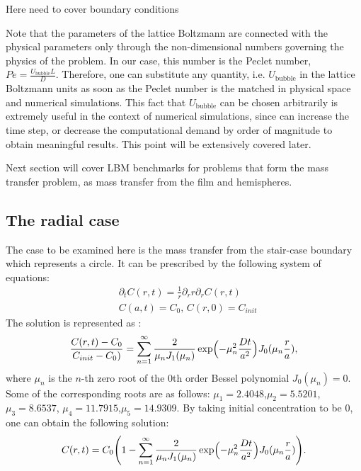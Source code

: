 \documentclass{article}
\newcommand{\beq}{\begin{equation}}
\newcommand{\feq}{\end{equation}}
\newcommand{\ububble}{U_{\mathrm{bubble}}}
\begin{document}
{\color{red} Here need to cover boundary conditions}

Note that the parameters of the lattice
Boltzmann are connected with the physical parameters only through the non-dimensional
numbers governing the physics of the problem. In our case, this number is the Peclet number, $Pe=\frac{\ububble L}{D}$.
Therefore, one can substitute any quantity, i.e.
$\ububble$ in the lattice Boltzmann units as soon as the
Peclet number is the matched in physical space and numerical simulations. This fact that $\ububble$ can be chosen arbitrarily is extremely useful in the context of numerical simulations, since can increase the time step, or decrease the computational demand by order of magnitude to obtain meaningful results. This point will be extensively covered later. 

Next section will cover LBM benchmarks for problems that form the mass transfer problem, as mass transfer from the film  and hemispheres.

\subsection{The radial case}
The case to be examined here is the mass transfer from the stair-case boundary which represents a circle. It can be
prescribed by the following system of equations:
\beq
\begin{aligned}
&\partial_t C(r,t)=\frac{1}{r}\partial_r r \partial_r C(r,t)\\
&C(a,t)=C_0,\,C(r,0)=C_{init}
\end{aligned}
\feq 
The solution is represented as \cite{chemical-correlations}:
\beq
\frac{C(r,t)-C_{0}}{C_{init}-C_{0})}=\sum_{n=1}^{\infty}{\frac{2}{\mu_n
J_1(\mu_n)}\exp\Bigl(-\mu_n^2 \frac{D t}{a^2} \Bigr)J_0(\mu_n \frac{r}{a})},
\feq
where $\mu_n$ is the $n$-th zero root of the $0$th order Bessel polynomial $J_0(\mu_n)=0$. Some of
the corresponding roots are as follows: $\mu_1=2.4048$,$\mu_2=5.5201$,$\mu_3=8.6537$,
$\mu_4=11.7915$,$\mu_5=14.9309$.
By taking initial concentration to be $0$, one can obtain the following solution:
\beq
C(r,t)=C_0 \Biggl(1 - \sum_{n=1}^{\infty}{\frac{2}{\mu_n
J_1(\mu_n)}\exp\Bigl(-\mu_n^2 \frac{D t}{a^2} \Bigr)J_0(\mu_n \frac{r}{a})}\Biggr).
\feq
\end{document}
